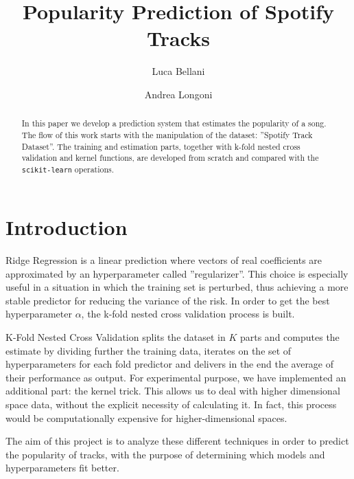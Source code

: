 \documentclass{article}
\begin{document}
\title{\textbf{Popularity Prediction of Spotify Tracks}}
\author{Luca Bellani}
\author{Andrea Longoni}
\date{}

\maketitle


\begin{abstract}
	In this paper we develop a prediction system that estimates the popularity of a song. The flow of this work starts with the manipulation of the dataset: ''Spotify Track Dataset''. The training and estimation parts, together with k-fold nested cross validation and kernel functions, are developed from scratch and compared with the \texttt{scikit-learn} operations. 
\end{abstract}
    
    
\section{Introduction}
Ridge Regression is a linear prediction where vectors of real coefficients are approximated by an hyperparameter called ''regularizer''. This choice is especially useful in a situation in which the training set is perturbed, thus achieving a more stable predictor for reducing the variance of the risk. \newline
In order to get the best hyperparameter $\alpha$, the k-fold nested cross validation process is built.

K-Fold Nested Cross Validation splits the dataset in $K$ parts and computes the estimate by dividing further the training data, iterates on the set of hyperparameters for each fold predictor and delivers in the end the average of their performance as output.  
For experimental purpose, we have implemented an additional part: the kernel trick. This allows us to deal with higher dimensional space data, without the explicit necessity of calculating it. In fact, this process would be computationally expensive for higher-dimensional spaces.\newline
    
The aim of this project is to analyze these different techniques in order to predict the popularity of tracks, with the purpose of determining which models and hyperparameters fit better. 
     
    
\end{document}
